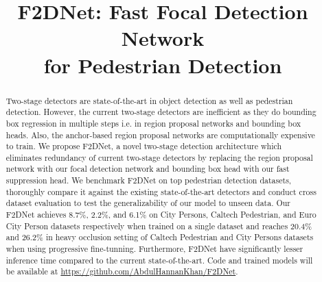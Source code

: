 \documentclass[a4paper,conference]{IEEEtran}
\begin{document}
\title{F2DNet: Fast Focal Detection Network \\ for Pedestrian Detection}








\author{
}









\maketitle

\begin{abstract}
Two-stage detectors are state-of-the-art in object detection as well as pedestrian detection. However, the current two-stage detectors are inefficient as they do bounding box regression in multiple steps i.e. in region proposal networks and bounding box heads. Also, the anchor-based region proposal networks are computationally expensive to train. We propose F2DNet, a novel two-stage detection architecture which eliminates redundancy of current two-stage detectors by replacing the region proposal network with our focal detection network and bounding box head with our fast suppression head. We benchmark F2DNet on top pedestrian detection datasets, thoroughly compare it against the existing state-of-the-art detectors and conduct cross dataset evaluation to test the generalizability of our model to unseen data. Our F2DNet achieves 8.7\%, 2.2\%, and 6.1\%  on City Persons, Caltech Pedestrian, and Euro City Person datasets respectively when trained on a single dataset and reaches 20.4\% and 26.2\%  in heavy occlusion setting of Caltech Pedestrian and City Persons datasets when using progressive fine-tunning. Furthermore, F2DNet have significantly lesser inference time compared to the current state-of-the-art. Code and trained models will be available at \url{https://github.com/AbdulHannanKhan/F2DNet}.


\end{abstract} 
\end{document}
